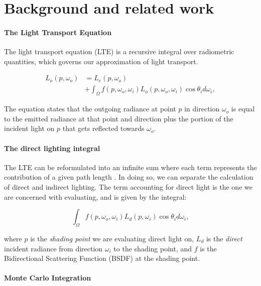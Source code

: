 \section{Background and related work}
\label{sec:background}

\paragraph*{The Light Transport Equation} 
The light transport equation (LTE) \cite{kajiyaRENDERINGEQUATION1986} is a recursive integral over radiometric quantities, which governs our approximation of light transport.

\begin{equation}
  \begin{aligned}
  L_o(p, \omega_o) &= L_e(p, \omega_o)\\
  &+ \int_{\Omega} f(p, \omega_o, \omega_i) L_o(p, \omega_o, \omega_i) \cos\theta_i d\omega_i,
  \end{aligned}
\end{equation}

The equation states that the outgoing radiance at point $p$ in direction $\omega_o$ is equal to the emitted radiance at that point and direction plus the portion of the incident light on $p$ that gets reflected towards $\omega_o$.

\paragraph{The direct lighting integral} 

The LTE can be reformulated into an infinite sum where each term represents the contribution of a given path length \cite*[]{veachROBUSTMONTECARLO}. In doing so, we can separate the calculation of direct and indirect lighting. The term accounting for direct light is the one we are concerned with evaluating, and is given by the integral:

\begin{equation}
  \int_{\Omega} f(p, \omega_o, \omega_i) L_d(p, \omega_i) \cos\theta_i d\omega_i,
  \label{eq:directlighting}
\end{equation}

where $p$ is the \emph{shading point} we are evaluating direct light on, $L_d$ is the \emph{direct} incident radiance from direction $\omega_i$ to the shading point, and $f$ is the Bidirectional Scattering Function (BSDF) at the shading point. 

\paragraph*{Monte Carlo Integration}

